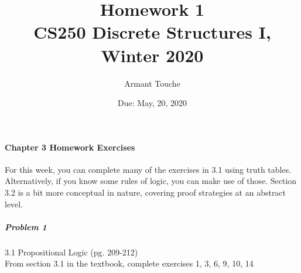 \documentclass[11pt,a4paper]{article}
\title{\bf Homework 1\\[1ex]
\rm\normalsize CS250 Discrete Structures I, Winter 2020 }
\date{\normalsize Due: May, 20, 2020}
\author{\normalsize Armant Touche}
\begin{document}
 
\vspace{0cm}\maketitle 

	\paragraph{Chapter 3 Homework Exercises} For this week, you can complete many of the exercises in 3.1 using truth tables. Alternatively, if you know some rules of logic, you can make use of those. Section 3.2 is a bit more conceptual in nature, covering proof strategies at an abstract level.
	
	\subparagraph{Problem 1} 3.1 Propositional Logic (pg. 209-212) \\
			
		From section 3.1 in the textbook, complete exercises 1, 3, 6, 9, 10, 14
\end{document}

